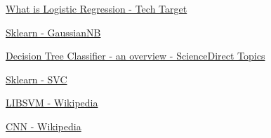 \documentclass[conference]{IEEEtran}
\begin{document}
\begin{thebibliography}{00}
\href{https://www.techtarget.com/searchbusinessanalytics/definition/logistic-regression#:~:text=Logistic\%20regression\%20is\%20a\%20statistical,or\%20more\%20existing\%20independent\%20variables.}{What is Logistic Regression - Tech Target}

\href{https://scikit-learn.org/stable/modules/generated/sklearn.naive_bayes.GaussianNB.html}{Sklearn - GaussianNB}

\href{https://www.sciencedirect.com/topics/computer-science/decision-tree-classifier}{Decision Tree Classifier - an overview - ScienceDirect Topics}

\href{https://scikit-learn.org/stable/modules/generated/sklearn.svm.SVC.html}{Sklearn - SVC}

\href{https://en.wikipedia.org/wiki/LIBSVM}{LIBSVM - Wikipedia}

\href{https://en.wikipedia.org/wiki/Convolutional_neural_network}{CNN - Wikipedia}
\end{thebibliography}
\end{document}
